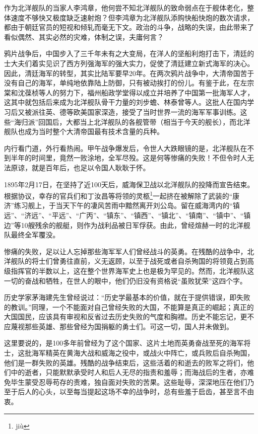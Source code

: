 \documentclass[12pt,UTF8]{ctexbook}
\begin{document}
作为北洋舰队的当家人李鸿章，他何尝不知北洋舰队的致命弱点在于舰体老化，整体速度不够快又极度缺乏速射炮？但李鸿章为北洋舰队添购快船快炮的数次请求，都由于朝廷官员的短视和倾轧而毫无下文。政治的斗争，战略的失误，由此带来了看似偶然、其实必然的灾难，体制之误，夫庸何言？

鸦片战争后，中国步入了三千年未有之大变局，在洋人的坚船利炮打击下，清廷的士大夫们着实见识了西方列强海军的强大实力，促使了清廷建立新式海军的决心。因此，清廷海军的转型，其实比陆军要早20年。在两次鸦片战争中，大清帝国苦于没有自己的海军，单纯地依靠陆上防御，只有被动挨打的份儿。有鉴于此，在左宗棠和沈葆桢等人的努力下，福州船政学堂得以成立并培养了中国第一批海军人才，这其中就包括后来成为北洋舰队骨干力量的刘步蟾、林泰曾等人。这批人在国内学习后又被派往英、德等欧美国家深造，接受了当时世界一流的海军军事训练。这些“海归派”回国后，大都当上北洋舰队的各舰管带（相当于今天的舰长），而北洋舰队也成为当时整个大清帝国最有技术含量的兵种。

内行看门道，外行看热闹。甲午战争爆发后，令世人大跌眼镜的是，北洋舰队在不到半年的时间里，竟然一败涂地，全军尽殁。这是何等惨痛的失败！不但令时人无法原谅，就是百年后，也足以令国人耿耿于怀。

1895年2月17日，在坚持了近100天后，威海保卫战以北洋舰队的投降而宣告结束。根据协议，幸存的官兵们和丁汝昌等将领的灵柩\footnote{ji\`u}一起挤在被解除了武装的“康济”练习舰上，于当天下午的凄风苦雨中黯然离开刘公岛。留在威海湾内的“镇远”、“济远”、“平远”、“广丙”、“镇东”、“镇西”、“镇北”、“镇南”、“镇中”、“镇边”等10艘残余的舰艇，则作为战利品被日军俘获。由此，曾经煊赫一时的北洋舰队最终全军覆没。

惨痛的失败，足以让人忘掉那些海军军人们曾经战斗的英勇。在残酷的战争中，北洋舰队的将士们曾勇往直前，义无返顾，以至于战死或者自杀殉国的将领竟占到高级指挥官的半数以上，这在整个世界海军史上也是极为罕见的。然而，北洋舰队这一切的奋战和牺牲，在世人的眼中，他们仍旧没有资格说“虽败犹荣”这四个字。

历史学家茅海建先生曾经说过：“历史学最基本的价值，就在于提供错误，即失败的教训。”同理，一个不能面对自己曾经失败的大国，不能算是真正的崛起；真正的大国国民，应该具有审视和反省过去历史失败的气度和胸襟。历史不能忘记，更不应蔑视那些英雄、那些曾经为国捐躯的勇士们。可这一切，国人并未做到。

这里要说的，是100多年前曾经为了这个国家、这片土地而英勇奋战至死的海军将士，这批海军精英在黄海大战和威海之役中，或战火中阵亡，或兵败后自杀殉国，他们是一群失败的英雄。残酷的战争结束后，这些活着的和逝去的败军之将们，他们中的逝者，只能默默承受时人和后人无尽的指责和羞辱；而海战后的生者，亦难免毕生蒙受忍辱苟存的责难，独自面对失败的苦果。这些耻辱，深深地压在他们乃至于后人的心头，以至每当提起这场不幸的战争时，总有些羞于启齿，甚至言不由衷。
\end{document}
